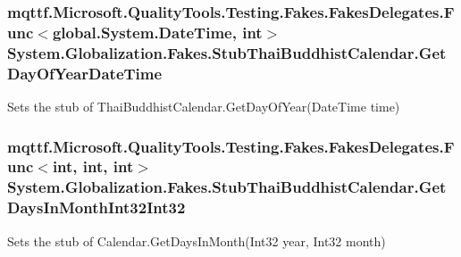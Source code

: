 \hypertarget{class_system_1_1_globalization_1_1_fakes_1_1_stub_thai_buddhist_calendar_ac289731b794a71365e24401424e0550c}{
\subsubsection[{Get\-Day\-Of\-Year\-Date\-Time}]{\setlength{\rightskip}{0pt plus 5cm}mqttf.\-Microsoft.\-Quality\-Tools.\-Testing.\-Fakes.\-Fakes\-Delegates.\-Func$<$global.\-System.\-Date\-Time, int$>$ System.\-Globalization.\-Fakes.\-Stub\-Thai\-Buddhist\-Calendar.\-Get\-Day\-Of\-Year\-Date\-Time}}\label{class_system_1_1_globalization_1_1_fakes_1_1_stub_thai_buddhist_calendar_ac289731b794a71365e24401424e0550c}


Sets the stub of Thai\-Buddhist\-Calendar.\-Get\-Day\-Of\-Year(\-Date\-Time time)

\hypertarget{class_system_1_1_globalization_1_1_fakes_1_1_stub_thai_buddhist_calendar_a08e00baeb535fde6b78f1d0e6bdc2263}{
\subsubsection[{Get\-Days\-In\-Month\-Int32\-Int32}]{\setlength{\rightskip}{0pt plus 5cm}mqttf.\-Microsoft.\-Quality\-Tools.\-Testing.\-Fakes.\-Fakes\-Delegates.\-Func$<$int, int, int$>$ System.\-Globalization.\-Fakes.\-Stub\-Thai\-Buddhist\-Calendar.\-Get\-Days\-In\-Month\-Int32\-Int32}}\label{class_system_1_1_globalization_1_1_fakes_1_1_stub_thai_buddhist_calendar_a08e00baeb535fde6b78f1d0e6bdc2263}


Sets the stub of Calendar.\-Get\-Days\-In\-Month(\-Int32 year, Int32 month)

